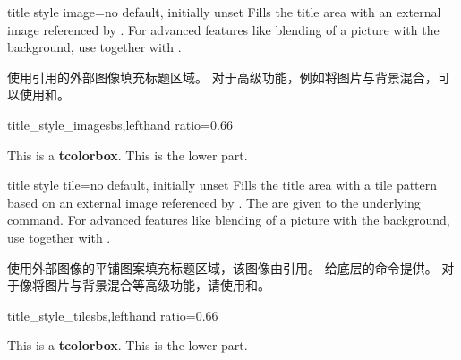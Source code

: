 \begin{docTcbKey}{title style image}{=}{no default, initially unset}
Fills the title area with an external image referenced by .
For advanced features like blending of a picture with the background,
use  together with .

使用引用的外部图像填充标题区域。 对于高级功能，例如将图片与背景混合，可以使用和。
\begin{exdispExample*}{title_style_image}{sbs,lefthand ratio=0.66}

\begin{tcolorbox}[enhanced,title=My title,
title style image=blueshade.png]
This is a \textbf{tcolorbox}.
\tcblower
This is the lower part.
\end{tcolorbox}
\end{exdispExample*}
\end{docTcbKey}

\begin{docTcbKey}{title style tile}{=}{no default, initially unset}
Fills the title area with a tile pattern based on an external image referenced by .
The  are given to the underlying  command.
For advanced features like blending of a picture with the background,
use  together with .

使用外部图像的平铺图案填充标题区域，该图像由引用。 给底层的命令提供。 对于像将图片与背景混合等高级功能，请使用和。
\begin{exdispExample*}{title_style_tile}{sbs,lefthand ratio=0.66}

\begin{tcolorbox}[enhanced,title=My title,
title style tile={width=1cm}{pink_marble.png}]
This is a \textbf{tcolorbox}.
\tcblower
This is the lower part.
\end{tcolorbox}
\end{exdispExample*}
\end{docTcbKey}



